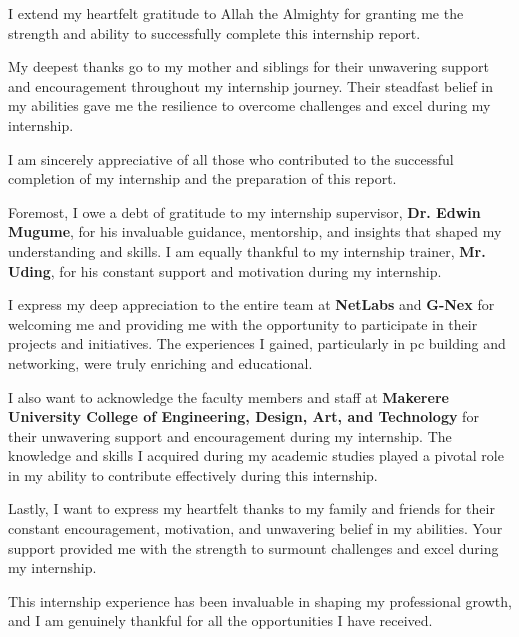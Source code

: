 
I extend my heartfelt gratitude to Allah the Almighty for granting me the strength and ability to successfully complete this internship report.

My deepest thanks go to my mother and siblings for their unwavering support and encouragement throughout my internship journey. Their steadfast belief in my abilities gave me the resilience to overcome challenges and excel during my internship.

I am sincerely appreciative of all those who contributed to the successful completion of my internship and the preparation of this report.

Foremost, I owe a debt of gratitude to my internship supervisor, \textbf{Dr. Edwin Mugume}, for his invaluable guidance, mentorship, and insights that shaped my understanding and skills. I am equally thankful to my internship trainer, \textbf{Mr. Uding}, for his constant support and motivation during my internship.

I express my deep appreciation to the entire team at \textbf{NetLabs} and \textbf{G-Nex} for welcoming me and providing me with the opportunity to participate in their projects and initiatives. The experiences I gained, particularly in pc building and networking, were truly enriching and educational.

I also want to acknowledge the faculty members and staff at \textbf{Makerere University College of Engineering, Design, Art, and Technology} for their unwavering support and encouragement during my internship. The knowledge and skills I acquired during my academic studies played a pivotal role in my ability to contribute effectively during this internship.

Lastly, I want to express my heartfelt thanks to my family and friends for their constant encouragement, motivation, and unwavering belief in my abilities. Your support provided me with the strength to surmount challenges and excel during my internship.

This internship experience has been invaluable in shaping my professional growth, and I am genuinely thankful for all the opportunities I have received.
